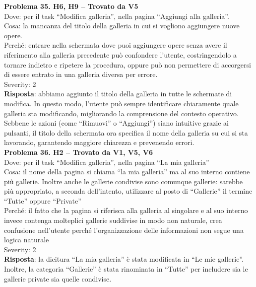\documentclass{article}
\begin{document}
\noindent \textbf{Problema 35. H6, H9 – Trovato da V5} \\
Dove: per il task “Modifica galleria”, nella pagina “Aggiungi alla galleria”. \\
Cosa: la mancanza del titolo della galleria in cui si vogliono aggiungere nuove opere. \\
Perché: entrare nella schermata dove puoi aggiungere opere senza avere il riferimento alla galleria precedente può confondere l’utente, costringendolo a tornare indietro e ripetere la procedura, oppure può non permettere di accorgersi di essere entrato in una galleria diversa per errore. \\
Severity: 2 \\
\textbf{Risposta}:  abbiamo aggiunto il titolo della galleria in tutte le schermate di modifica. In questo modo, l’utente può sempre identificare chiaramente quale galleria sta modificando, migliorando la comprensione del contesto operativo. Sebbene le azioni (come “Rimuovi” o “Aggiungi”) siano intuitive grazie ai pulsanti, il titolo della schermata ora specifica il nome della galleria su cui si sta lavorando, garantendo maggiore chiarezza e prevenendo errori. \\

\noindent \textbf{Problema 36. H2 – Trovato da V1, V5, V6} \\
Dove: per il task “Modifica galleria”, nella pagina “La mia galleria” \\
Cosa: il nome della pagina si chiama “la mia galleria” ma al suo interno contiene più gallerie. Inoltre anche le gallerie condivise sono comunque gallerie: sarebbe più appropriato, a seconda dell’intento, utilizzare al posto di “Gallerie” il termine “Tutte” oppure “Private” \\
Perché: il fatto che la pagina si riferisca alla galleria al singolare e al suo interno invece contenga molteplici gallerie suddivise in modo non naturale, crea confusione nell’utente perché l’organizzazione delle informazioni non segue una logica naturale \\
Severity: 2 \\
\textbf{Risposta}: la dicitura “La mia galleria” è stata modificata in “Le mie gallerie”. Inoltre, la categoria “Gallerie” è stata rinominata in “Tutte” per includere sia le gallerie private sia quelle condivise.\\
\end{document}
